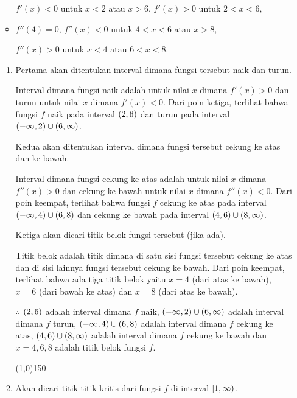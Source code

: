 \begin{enumerate}[leftmargin=*, label={\arabic*}.]
\begin{itemize}
    $f'(x)<0$ untuk $x < 2$ atau $x>6$, $f'(x)>0$ untuk $2<x<6$,
    \item $f''(4) = 0$, $f''(x)<0$ untuk $4<x<6$ atau $x > 8$,
    
    $f''(x)>0$ untuk $x<4$ atau $6 < x < 8$.
    \end{itemize}
    \begin{enumerate}[label={\alph*}.]
    \item Pertama akan ditentukan interval dimana fungsi tersebut naik dan turun.
    
    Interval dimana fungsi naik adalah untuk nilai $x$ dimana $f'(x) > 0$ dan turun 
    untuk nilai $x$ dimana $f'(x) < 0$. Dari poin ketiga, terlihat bahwa fungsi $f$ 
    naik pada interval $(2,6)$ dan turun pada interval 
    $(-\infty,2) \cup (6,\infty)$.
    
    Kedua akan ditentukan interval dimana fungsi tersebut cekung ke atas dan ke bawah.

    Interval dimana fungsi cekung ke atas adalah untuk nilai $x$ dimana $f''(x) > 0$ 
    dan cekung ke bawah untuk nilai $x$ dimana $f''(x) < 0$. Dari poin keempat, terlihat 
    bahwa fungsi $f$ cekung ke atas pada interval 
    $(-\infty,4) \cup (6,8)$ dan cekung ke bawah pada interval 
    $(4,6) \cup (8,\infty)$.

    Ketiga akan dicari titik belok fungsi tersebut (jika ada).

    Titik belok adalah titik dimana di satu sisi fungsi tersebut cekung ke atas dan 
    di sisi lainnya fungsi tersebut cekung ke bawah. Dari poin keempat, terlihat bahwa 
    ada tiga titik belok yaitu $x=4$ (dari atas ke bawah), $x=6$ (dari bawah ke atas) 
    dan $x=8$ (dari atas ke bawah).

    $\therefore$ $(2,6)$ adalah interval dimana $f$ naik, 
    $(-\infty,2) \cup (6,\infty)$ adalah interval dimana $f$ 
    turun, $(-\infty,4) \cup (6,8)$ adalah interval dimana $f$ 
    cekung ke atas, $(4,6) \cup (8,\infty)$ adalah interval 
    dimana $f$ cekung ke bawah dan $x=4,6,8$ adalah titik belok fungsi $f$.


\begin{center}\line(1,0){150}\end{center}


    \item Akan dicari titik-titik kritis dari fungsi $f$ di interval $[1,\infty)$.
    

\end{enumerate}
\end{enumerate}
